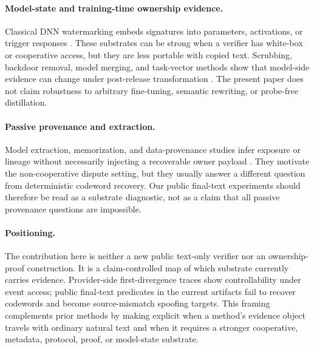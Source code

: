 \paragraph{Model-state and training-time ownership evidence.}
Classical DNN watermarking embeds signatures into parameters, activations, or
trigger responses
\cite{uchida2017embedding,zhang2018protecting,adi2018turning,rouhani2019deepsigns,jia2021entangled,szyller2021dawn,krauss2024clearstamp}.
These substrates can be strong when a verifier has white-box or cooperative
access, but they are less portable with copied text.  Scrubbing, backdoor
removal, model merging, and task-vector methods show that model-side evidence
can change under post-release transformation
\cite{zhang2025meraser,zeng2024beear,li2024backdoor,hubinger2024sleeper,wortsman2022model,ilharco2023task,yadav2023ties}.
The present paper does not claim robustness to arbitrary fine-tuning,
semantic rewriting, or probe-free distillation.

\paragraph{Passive provenance and extraction.}
Model extraction, memorization, and data-provenance studies infer exposure or
lineage without necessarily injecting a recoverable owner payload
\cite{carlini2024stealing,liang2024model,xie2024recall,puerto2025scaling,ravichander2025imprint}.
They motivate the non-cooperative dispute setting, but they usually answer a
different question from deterministic codeword recovery.  Our public
final-text experiments should therefore be read as a substrate diagnostic, not
as a claim that all passive provenance questions are impossible.

\paragraph{Positioning.}
The contribution here is neither a new public text-only verifier nor an
ownership-proof construction.  It is a claim-controlled map of which substrate
currently carries evidence.  Provider-side first-divergence traces show
controllability under event access; public final-text predicates in the
current artifacts fail to recover codewords and become source-mismatch
spoofing targets.  This framing complements prior methods by making explicit
when a method's evidence object travels with ordinary natural text and when it
requires a stronger cooperative, metadata, protocol, proof, or model-state
substrate.
